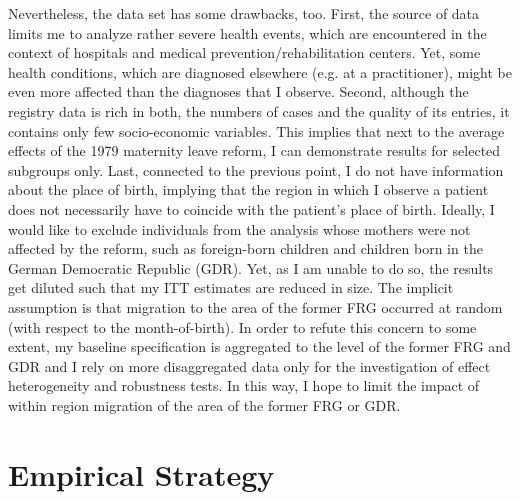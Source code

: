 \documentclass[11pt, a4paper,draft]{article} %
\begin{document}
Nevertheless, the data set has some drawbacks, too. First, the source of data limits me to analyze rather severe health events, which are encountered in the context of hospitals and medical prevention/rehabilitation centers. Yet, some health conditions, which are diagnosed elsewhere (e.g. at a practitioner), might be even more affected than the diagnoses that I observe.  %
Second, although the registry data is rich in both, the numbers of cases and the quality of its entries, it contains only few socio-economic variables. This implies that next to the average effects of the 1979 maternity leave reform, I can demonstrate results for selected subgroups only. Last, connected to the previous point, I do not have information about the place of birth, implying that the region in which I observe a patient does not necessarily have to coincide with the patient's place of birth. Ideally, I would like to exclude individuals from the analysis whose mothers were not affected by the reform, such as foreign-born children and children born in the German Democratic Republic (GDR). Yet, as I am unable to do so, the results get diluted such that my ITT estimates are reduced in size. The implicit assumption is that migration to the area of the former FRG occurred at random (with respect to the month-of-birth). In order to refute this concern to some extent, my baseline specification is aggregated to the level of the former FRG and GDR and I rely on more disaggregated data only for the investigation of effect heterogeneity and robustness tests. In this way, I hope to limit the impact of within region migration of the area of the former FRG or GDR. \newline


















\bigskip
\section{Empirical Strategy}\label{sec:empirical_strategy}
\end{document}
